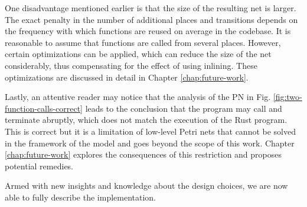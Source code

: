 One disadvantage mentioned earlier is that the size of the resulting net is larger.
The exact penalty in the number of additional places and transitions depends
on the frequency with which functions are reused on average in the codebase.
It is reasonable to assume that functions are called from several places.
However, certain optimizations can be applied,
which can reduce the size of the net considerably,
thus compensating for the effect of using inlining.
These optimizations are discussed in detail in Chapter \ref{chap:future-work}.

Lastly, an attentive reader may notice that
the analysis of the \acrshort{PN} in Fig. \ref{fig:two-function-calls-correct}
leads to the conclusion that
the program may call  and terminate abruptly,
which does not match the execution of the Rust program.
This is correct but it is a limitation of low-level Petri nets
that cannot be solved in the framework of the model and
goes beyond the scope of this work.
Chapter \ref{chap:future-work} explores
the consequences of this restriction and proposes potential remedies.

Armed with new insights and knowledge about the design choices,
we are now able to fully describe the implementation.
